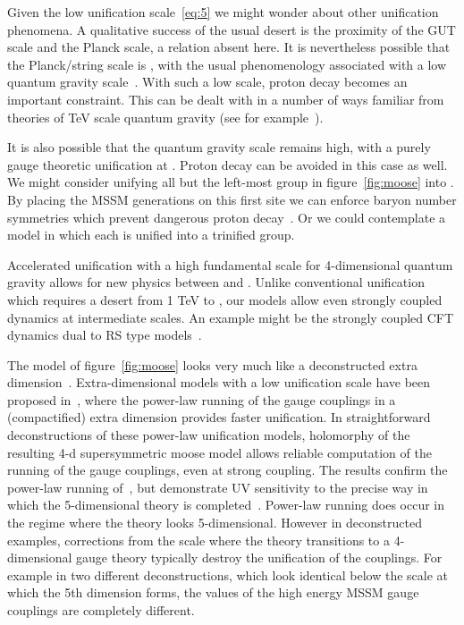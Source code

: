 \documentclass[a4paper,prl,twocolumn]{revtex4}
\begin{document}
Given the low unification scale~\eqref{eq:5} we might wonder about
other unification phenomena. A qualitative success of the usual desert
is the proximity of the GUT scale and the Planck scale, a relation
absent here. It is nevertheless possible that the Planck/string scale
is \coordHE{}, with the usual phenomenology associated with a low quantum
gravity scale~\cite{Arkani-Hamed:1998rs}.  With such a low scale,
proton decay becomes an important constraint.  This can be dealt with
in a number of ways familiar from theories of TeV scale quantum
gravity (see for example~\cite{Arkani-Hamed:1999dc}).

It is also possible that the quantum gravity scale remains high, with
a purely gauge theoretic unification at \coordHE{}. Proton decay can be
avoided in this case as well.  We might consider unifying all but the
left-most group in figure~\ref{fig:moose} into \coordHE{}.  By placing
the MSSM generations on this first site we can enforce baryon number
symmetries which prevent dangerous proton decay~\cite{Weiner:2001pv}.
Or we could contemplate a model in which each \coordHE{} is unified into a
trinified group.

Accelerated unification with a high fundamental scale for
4-dimensional quantum gravity allows for new physics between \coordHE{} and
\coordHE{}. Unlike conventional unification which requires a
desert from 1 TeV to \coordHE{}, our models allow even strongly coupled
dynamics at intermediate scales. An example might be the strongly
coupled CFT dynamics  dual to RS type models~\cite{Randall:1999ee}.

The model of figure~\ref{fig:moose} looks very much like a
deconstructed extra dimension~\cite{Arkani-Hamed:2001ca,Hill:2000mu}.
Extra-dimensional models with a low unification scale have been
proposed in~\cite{Dienes:1998vh}, where the power-law running of the
gauge couplings in a (compactified) extra dimension provides faster
unification. In straightforward deconstructions of these power-law
unification models, holomorphy of the resulting 4-d supersymmetric
moose model allows reliable computation of the running of the gauge
couplings, even at strong coupling. The results confirm the power-law
running of~\cite{Dienes:1998vh}, but demonstrate UV sensitivity to the
precise way in which the 5-dimensional theory is
completed~\cite{comm}.  Power-law running does occur in the regime
where the theory looks 5-dimensional. However in deconstructed
examples, corrections from the scale where the theory transitions to a
4-dimensional gauge theory typically destroy the unification of the
couplings.  For example in two different deconstructions, which look
identical below the scale at which the 5th dimension forms, the values
of the high energy MSSM gauge couplings are completely different.
\end{document}
